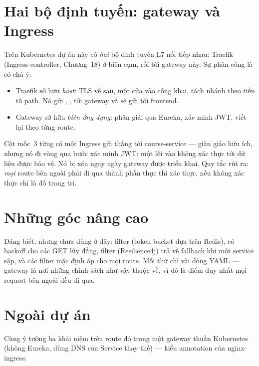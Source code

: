 \section{Hai bộ định tuyến: gateway và Ingress}

Trên Kubernetes dự án này có \emph{hai} bộ định tuyến L7 nối tiếp
nhau: Traefik (Ingress controller, Chương~18) ở biên cụm, rồi tới
gateway này. Sự phân công là có chủ ý:

\begin{itemize}
  \item Traefik sở hữu \emph{host}: TLS về sau, một cửa vào công khai,
  tách nhánh theo tiền tố path. Nó gửi , ,
   tới gateway và sẽ gửi \code{/} tới frontend.
  \item Gateway sở hữu \emph{biên ứng dụng}: phân giải qua Eureka,
  xác minh JWT, viết lại theo từng route.
\end{itemize}

\begin{decision}
Cột mốc~3 từng có một Ingress gửi  thẳng tới
course-service --- giàn giáo hữu ích, nhưng nó đi vòng qua bước xác minh
JWT: một lối vào không xác thực tới dữ liệu được bảo vệ. Nó bị xóa ngay
ngày gateway được triển khai. Quy tắc rút ra: \emph{mọi} route bên
ngoài phải đi qua thành phần thực thi xác thực, nếu không xác thực chỉ
là đồ trang trí.
\end{decision}

\section{Những góc nâng cao}

Đáng biết, nhưng chưa dùng ở đây: filter 
(token bucket dựa trên Redis),  có backoff cho các GET lũy
đẳng, filter  (Resilience4j) trả về fallback khi
một service sập, và các filter mặc định áp cho mọi route. Mỗi thứ chỉ
vài dòng YAML --- gateway là nơi những chính sách như vậy thuộc về, vì
đó là điểm duy nhất mọi request bên ngoài đều đi qua.

\section{Ngoài dự án}

Cùng ý tưởng ba khái niệm trên route đó trong một gateway thuần
Kubernetes (không Eureka, dùng DNS của Service thay thế) --- kiểu
annotation của nginx-ingress:

